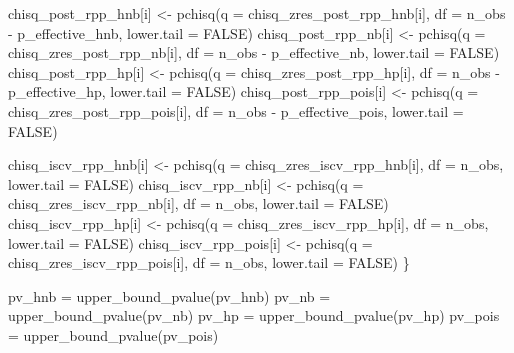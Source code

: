 \documentclass[
  english,
  letterpaper,
  DIV=11,
  numbers=noendperiod]{scrartcl}
\newenvironment{Shaded}{\begin{snugshade}}{\end{snugshade}}
\newcommand{\AttributeTok}[1]{\textcolor[rgb]{0.40,0.45,0.13}{#1}}
\newcommand{\ConstantTok}[1]{\textcolor[rgb]{0.56,0.35,0.01}{#1}}
\newcommand{\FunctionTok}[1]{\textcolor[rgb]{0.28,0.35,0.67}{#1}}
\newcommand{\NormalTok}[1]{\textcolor[rgb]{0.00,0.23,0.31}{#1}}
\newcommand{\OtherTok}[1]{\textcolor[rgb]{0.00,0.23,0.31}{#1}}
\newcommand{\SpecialCharTok}[1]{\textcolor[rgb]{0.37,0.37,0.37}{#1}}
\begin{document}
\begin{Shaded}
\begin{Highlighting}[]
\NormalTok{  chisq\_post\_rpp\_hnb[i]  }\OtherTok{\textless{}{-}} \FunctionTok{pchisq}\NormalTok{(}\AttributeTok{q =}\NormalTok{ chisq\_zres\_post\_rpp\_hnb[i],  }\AttributeTok{df =}\NormalTok{ n\_obs }\SpecialCharTok{{-}}\NormalTok{ p\_effective\_hnb,  }\AttributeTok{lower.tail =} \ConstantTok{FALSE}\NormalTok{)}
\NormalTok{  chisq\_post\_rpp\_nb[i]   }\OtherTok{\textless{}{-}} \FunctionTok{pchisq}\NormalTok{(}\AttributeTok{q =}\NormalTok{ chisq\_zres\_post\_rpp\_nb[i],   }\AttributeTok{df =}\NormalTok{ n\_obs }\SpecialCharTok{{-}}\NormalTok{ p\_effective\_nb,   }\AttributeTok{lower.tail =} \ConstantTok{FALSE}\NormalTok{)}
\NormalTok{  chisq\_post\_rpp\_hp[i]   }\OtherTok{\textless{}{-}} \FunctionTok{pchisq}\NormalTok{(}\AttributeTok{q =}\NormalTok{ chisq\_zres\_post\_rpp\_hp[i],   }\AttributeTok{df =}\NormalTok{ n\_obs }\SpecialCharTok{{-}}\NormalTok{ p\_effective\_hp,   }\AttributeTok{lower.tail =} \ConstantTok{FALSE}\NormalTok{)}
\NormalTok{  chisq\_post\_rpp\_pois[i] }\OtherTok{\textless{}{-}} \FunctionTok{pchisq}\NormalTok{(}\AttributeTok{q =}\NormalTok{ chisq\_zres\_post\_rpp\_pois[i], }\AttributeTok{df =}\NormalTok{ n\_obs }\SpecialCharTok{{-}}\NormalTok{ p\_effective\_pois, }\AttributeTok{lower.tail =} \ConstantTok{FALSE}\NormalTok{)}
  
\NormalTok{  chisq\_iscv\_rpp\_hnb[i]  }\OtherTok{\textless{}{-}} \FunctionTok{pchisq}\NormalTok{(}\AttributeTok{q =}\NormalTok{ chisq\_zres\_iscv\_rpp\_hnb[i],  }\AttributeTok{df =}\NormalTok{ n\_obs,  }\AttributeTok{lower.tail =} \ConstantTok{FALSE}\NormalTok{)}
\NormalTok{  chisq\_iscv\_rpp\_nb[i]   }\OtherTok{\textless{}{-}} \FunctionTok{pchisq}\NormalTok{(}\AttributeTok{q =}\NormalTok{ chisq\_zres\_iscv\_rpp\_nb[i],   }\AttributeTok{df =}\NormalTok{ n\_obs,   }\AttributeTok{lower.tail =} \ConstantTok{FALSE}\NormalTok{)}
\NormalTok{  chisq\_iscv\_rpp\_hp[i]   }\OtherTok{\textless{}{-}} \FunctionTok{pchisq}\NormalTok{(}\AttributeTok{q =}\NormalTok{ chisq\_zres\_iscv\_rpp\_hp[i],   }\AttributeTok{df =}\NormalTok{ n\_obs,   }\AttributeTok{lower.tail =} \ConstantTok{FALSE}\NormalTok{)}
\NormalTok{  chisq\_iscv\_rpp\_pois[i] }\OtherTok{\textless{}{-}} \FunctionTok{pchisq}\NormalTok{(}\AttributeTok{q =}\NormalTok{ chisq\_zres\_iscv\_rpp\_pois[i], }\AttributeTok{df =}\NormalTok{ n\_obs, }\AttributeTok{lower.tail =} \ConstantTok{FALSE}\NormalTok{)}
\NormalTok{\}}

\NormalTok{pv\_hnb  }\OtherTok{=} \FunctionTok{upper\_bound\_pvalue}\NormalTok{(pv\_hnb)}
\NormalTok{pv\_nb   }\OtherTok{=} \FunctionTok{upper\_bound\_pvalue}\NormalTok{(pv\_nb)}
\NormalTok{pv\_hp   }\OtherTok{=} \FunctionTok{upper\_bound\_pvalue}\NormalTok{(pv\_hp)}
\NormalTok{pv\_pois }\OtherTok{=} \FunctionTok{upper\_bound\_pvalue}\NormalTok{(pv\_pois)}


\end{Highlighting}
\end{Shaded}
\end{document}
